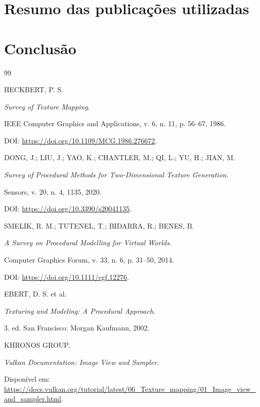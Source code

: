 \documentclass[12pt,a4paper]{report}
\begin{document}



\chapter{Resumo das publicações utilizadas}




\chapter{Conclusão}




\begin{thebibliography}{99}


HECKBERT, P. S.

\textit{Survey of Texture Mapping}.

IEEE Computer Graphics and Applications, v. 6, n. 11, p. 56--67, 1986.

DOI:
\url{https://doi.org/10.1109/MCG.1986.276672}.


DONG, J.; LIU, J.; YAO, K.; CHANTLER, M.; QI, L.; YU, H.; JIAN, M.

\textit{Survey of Procedural Methods for Two-Dimensional Texture Generation}.

Sensors, v. 20, n. 4, 1135, 2020.

DOI:
\url{https://doi.org/10.3390/s20041135}.


SMELIK, R. M.; TUTENEL, T.; BIDARRA, R.; BENES, B.

\textit{A Survey on Procedural Modelling for Virtual Worlds}.

Computer Graphics Forum, v. 33, n. 6, p. 31--50, 2014.

DOI:
\url{https://doi.org/10.1111/cgf.12276}.


EBERT, D. S. et al.

\textit{Texturing and Modeling: A Procedural Approach}.

3. ed. San Francisco: Morgan Kaufmann, 2002.


KHRONOS GROUP.

\textit{Vulkan Documentation: Image View and Sampler}.

Disponível em:
\url{https://docs.vulkan.org/tutorial/latest/06_Texture_mapping/01_Image_view_and_sampler.html}.


\end{thebibliography}
\end{document}
